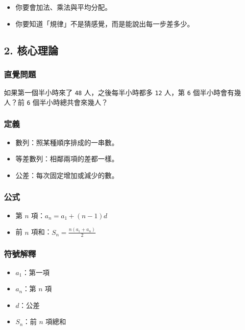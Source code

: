 \documentclass[
  chinese,
  12pt,
  a4paper,
  oneside]{article}
\providecommand{\tightlist}{%
  \setlength{\itemsep}{0pt}\setlength{\parskip}{0pt}}
\begin{document}
\begin{itemize}
\tightlist
\item
  你要會加法、乘法與平均分配。
\item
  你要知道「規律」不是猜感覺，而是能說出每一步差多少。
\end{itemize}

\subsection{2. 核心理論}\label{ux6838ux5fc3ux7406ux8ad6}

\subsubsection{直覺問題}\label{ux76f4ux89baux554fux984c}

如果第一個半小時來了 \texttt{48} 人，之後每半小時都多 \texttt{12} 人，第
\texttt{6} 個半小時會有幾人？前 \texttt{6} 個半小時總共會來幾人？

\subsubsection{定義}\label{ux5b9aux7fa9}

\begin{itemize}
\tightlist
\item
  數列：照某種順序排成的一串數。
\item
  等差數列：相鄰兩項的差都一樣。
\item
  公差：每次固定增加或減少的數。
\end{itemize}

\subsubsection{公式}\label{ux516cux5f0f}

\begin{itemize}
\tightlist
\item
  第 \(n\) 項：\(a_n = a_1 + (n - 1)d\)
\item
  前 \(n\) 項和：\(S_n = \frac{n(a_1 + a_n)}{2}\)
\end{itemize}

\subsubsection{符號解釋}\label{ux7b26ux865fux89e3ux91cb}

\begin{itemize}
\tightlist
\item
  \(a_1\)：第一項
\item
  \(a_n\)：第 \(n\) 項
\item
  \(d\)：公差
\item
  \(S_n\)：前 \(n\) 項總和
\end{itemize}
\end{document}
